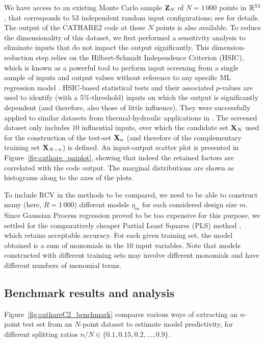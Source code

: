 We have access to an existing Monte Carlo sample ${\bf Z}_N$ of $N=1\,000$ points in $\mathbb{R}^{53}$, that corresponds to $53$ independent random input configurations; see \cite{ioobou10} for details. 
The output of the CATHARE2 code at these $N$ points is also available. 
To reduce the dimensionality of this dataset, we first performed a sensitivity analysis \cite{daveiga_iooss_2021} to eliminate inputs that do not impact the output significantly. 
This dimension-reduction step relies on the Hilbert-Schmidt Independence Criterion (HSIC), which is known as a powerful tool to perform input screening from a single sample of inputs and output values without reference to any specific ML regression model \cite{grebou05,dav15}. 
HSIC-based statistical tests and their associated $p$-values are used to identify (with a $5\%$-threshold) inputs on which the output is significantly dependent (and therefore, also those of little influence). 
They were successfully applied to similar datasets from thermal-hydraulic applications in \cite{marcha21,marioo21}. 
The screened dataset only includes $10$ influential inputs, over which the candidate set ${\bf X}_N$ used for the construction of the test-set ${\bf X}_n$ (and therefore of the complementary training set ${\bf X}_{N-n}$) is defined. 
An input-output scatter plot is presented in Figure~\ref{fig:cathare_paiplot}, showing that indeed the retained factors are correlated with the code output. 
The marginal distributions are shown as histograms along to the axes of the plots.

To include RCV in the methods to be compared, we need to be able to construct many (here, $R=1\,000$) different models $\eta_m$ for each considered design size $m$. 
Since Gaussian Process regression proved to be too expensive for this purpose, we settled for the comparatively cheaper Partial Least Squares (PLS) method \cite{wolsjo01}, which retains acceptable accuracy. 
For each given training set, the model obtained is a sum of monomials in the 10 input variables. 
Note that models constructed with different training sets may involve different monomials and have different numbers of monomial terms. 


\subsection{Benchmark results and analysis}

Figure~\ref{fig:cathareC2_benchmark} compares various ways of extracting an $n$-point test set from an $N$-point dataset to estimate model predictivity, for different splitting ratios $n/N\in\{0.1,0.15,0.2,\ldots,0.9\}$. 

